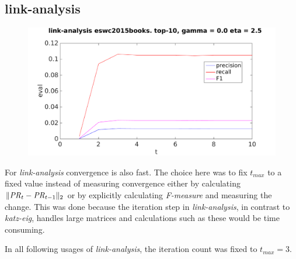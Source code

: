 \newpage


\subsection{link-analysis}

\begin{figure}[h!]
\centering
\begin{minipage}{.5\textwidth}
    \centering
    \includegraphics[width=\linewidth]{fig/link_t/eswc2015books_link_t.png}
\end{minipage}%
\end{figure}


For \textit{link-analysis} convergence is also fast. The choice here was to fix $t_{max}$ to a fixed value instead of measuring convergence either by calculating $\| \mathit{PR}_t - \mathit{PR}_{t - 1} \|_2$
or by explicitly calculating \textit{F-measure} and measuring the change. This was done because the iteration step in \textit{link-analysis}, in contrast to \textit{katz-eig}, handles large matrices and calculations such as these would be time consuming.

In all following usages of \textit{link-analysis}, the iteration count was fixed to $t_{max} = 3$.


